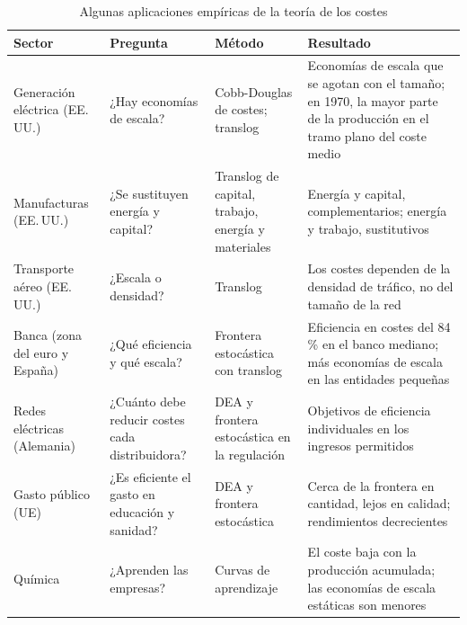 \documentclass[11pt]{article}
\begin{document}
\begin{table}[H]
\centering\small
\caption{Algunas aplicaciones empíricas de la teoría de los costes}\label{tab:ejemplos-sectores}
\renewcommand{\arraystretch}{1.3}
\begin{tabular}{|>{\raggedright\arraybackslash}p{}|>{\raggedright\arraybackslash}p{}|>{\raggedright\arraybackslash}p{}|>{\raggedright\arraybackslash}p{}|}
\hline
\rowcolor{tceeazulpalido}\textbf{Sector} & \textbf{Pregunta} & \textbf{Método} & \textbf{Resultado}\\
\hline
Generación eléctrica (EE.\,UU.) & ¿Hay economías de escala? & Cobb-Douglas de costes\nocite{Nerlove1963Returns}; translog\nocite{ChristensenGreene1976Economies} & Economías de escala que se agotan con el tamaño; en 1970, la mayor parte de la producción en el tramo plano del coste medio\\
\hline
Manufacturas (EE.\,UU.) & ¿Se sustituyen energía y capital? & Translog de capital, trabajo, energía y materiales\nocite{BerndtWood1975Technology} & Energía y capital, complementarios; energía y trabajo, sustitutivos\\
\hline
Transporte aéreo (EE.\,UU.) & ¿Escala o densidad? & Translog\nocite{CavesChristensenTretheway1984Density} & Los costes dependen de la densidad de tráfico, no del tamaño de la red\\
\hline
Banca (zona del euro y España) & ¿Qué eficiencia y qué escala? & Frontera estocástica con translog\nocite{BCE2019EficienciaBancos} & Eficiencia en costes del 84\,\% en el banco mediano; más economías de escala en las entidades pequeñas\\
\hline
Redes eléctricas (Alemania) & ¿Cuánto debe reducir costes cada distribuidora? & DEA y frontera estocástica en la regulación\nocite{BNetzA2026Effizienzvergleich} & Objetivos de eficiencia individuales en los ingresos permitidos\\
\hline
Gasto público (UE) & ¿Es eficiente el gasto en educación y sanidad? & DEA y frontera estocástica\nocite{ComisionEuropea2024EficienciaGasto} & Cerca de la frontera en cantidad, lejos en calidad; rendimientos decrecientes\\
\hline
Química & ¿Aprenden las empresas? & Curvas de aprendizaje\nocite{Lieberman1984Learning} & El coste baja con la producción acumulada; las economías de escala estáticas son menores\\
\hline
\end{tabular}
\end{table}
\end{document}
